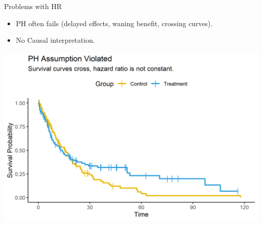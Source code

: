 \documentclass{beamer}
\begin{document}
\begin{frame}
\begin{columns}[T,onlytextwidth]
  \begin{column}{0.48\textwidth}
    \begin{block}{Problems with HR}
      \begin{itemize}
        \item PH often fails (delayed effects, waning benefit, crossing curves).
        \item No Causal interpretation.
      \end{itemize}
    \end{block}
    \centering
    \includegraphics[width=\linewidth,height = 0.9\linewidth]{images/ph_assumption_violated.png} 
  \end{column}
\end{columns}

\end{frame}
\end{document}
